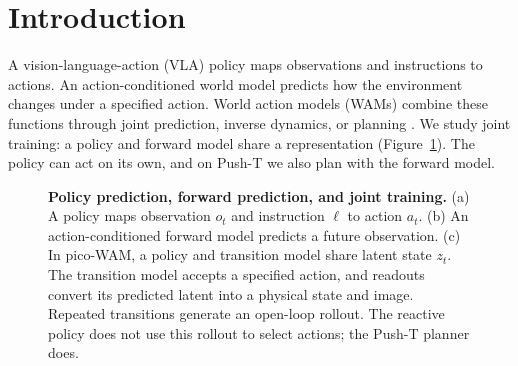 \documentclass[11pt]{article}
\begin{document}
\section{Introduction}

A vision-language-action (VLA) policy maps observations and instructions to actions. An action-conditioned world model predicts how the environment changes under a specified action. World action models (WAMs) combine these functions through joint prediction, inverse dynamics, or planning \citep{lu2026survey,shen2026survey}. We study joint training: a policy and forward model share a representation (Figure~\ref{fig:paradigms}). The policy can act on its own, and on Push-T we also plan with the forward model.

\begin{figure}[!htbp]
\centering
{}
\caption{\textbf{Policy prediction, forward prediction, and joint training.} (a) A policy maps observation $o_t$ and instruction $\ell$ to action $a_t$. (b) An action-conditioned forward model predicts a future observation. (c) In pico-WAM, a policy and transition model share latent state $z_t$. The transition model accepts a specified action, and readouts convert its predicted latent into a physical state and image. Repeated transitions generate an open-loop rollout. The reactive policy does not use this rollout to select actions; the Push-T planner does.}
\label{fig:paradigms}
\end{figure}
\end{document}
